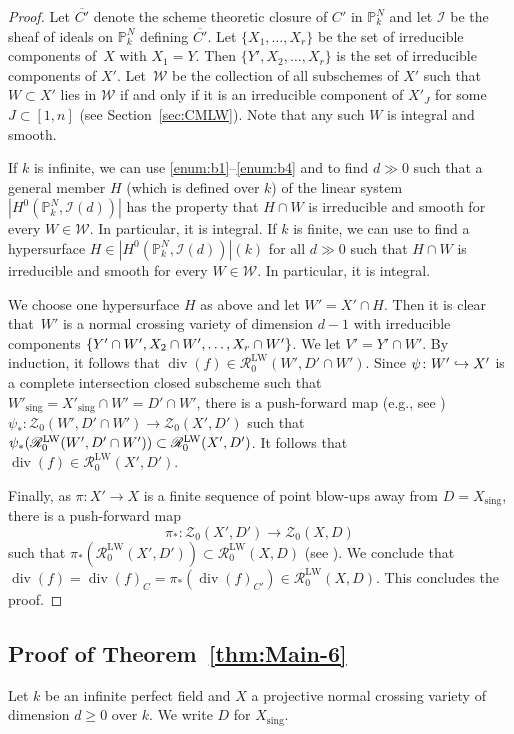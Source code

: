 \documentclass[JEP,XML,SOM,Unicode,published]{cedram}
\let\mathcal\mathscr
\def\hto{\mathrel{\lhook\joinrel\to}}
\let\inj\hto
\newcommand{\LW}{\mathrm{LW}}
\theoremstyle{definition}
\newcommand{\thmref}{Theorem~\ref}
\newcommand{\secref}{Section~\ref}
\newcommand{\sI}{{\mathcal I}}
\newcommand{\sR}{{\mathcal R}}
\newcommand{\sW}{{\mathcal W}}
\newcommand{\sZ}{{\mathcal Z}}
\renewcommand{\P}{{\mathbb P}}
\DeclareMathOperator{\divf}{div}
\newcommand{\sing}{\mathrm{sing}}
\let\ov\overline
\begin{document}
\begin{proof}
Let $\ov{C'}$ denote the scheme theoretic closure of $C'$ in $\P^N_k$ and let
$\sI$ be the sheaf of ideals on $\P^N_k$ defining $\ov{C'}$.
Let $\{X_1, \ldots , X_r\}$ be the set of irreducible components of~$X$
with $X_1 = Y$. Then $\{Y', X_2, \ldots , X_r\}$ is the set of irreducible
components of $X'$.
Let~$\sW$ be the collection of all subschemes of $X'$ such that
$W \subset X'$ lies in $\sW$ if and only if it is an irreducible component
of $X'_J$ for some $J \subset [1,n]$ (see \secref{sec:CMLW}).
Note that any such $W$ is integral and smooth.

If $k$ is infinite, we can use \eqref{enum:b1}--\eqref{enum:b4} and \cite[Th.\,3.12]{GK} to
find $d \gg 0$ such that a general member $H$ (which is defined over $k$) of
the linear system $|H^0(\P^N_k, \sI(d))|$ has the property that
$H \cap W$ is irreducible and smooth for every $W \in \sW$.
In particular, it is integral.
If $k$ is finite, we can use \cite[Prop.\,5.2, Th.\,8.4]{GK} to find a
hypersurface $H \in |H^0(\P^N_k, \sI(d))|(k)$ for all $d \gg 0$ such that
$H \cap W$ is irreducible and smooth for every $W \in \sW$.
In particular, it is integral.

We choose one hypersurface $H$ as above and let $W' = X' \cap H$. Then
it is clear that~$W'$ is a normal crossing variety of dimension $d-1$ with irreducible
components $\{Y' \cap\nobreak W', X_2 \cap W', \ldots , X_r \cap W'\}$.
We let $V' = Y' \cap W'$.
By induction, it follows that $\divf(f) \in \sR^{\LW}_0(W', D' \cap W')$.
Since $\psi \colon W' \inj X'$ is a complete intersection closed subscheme
such that $W'_{\sing} = X'_{\sing} \cap W' = D' \cap W'$, there is a
push-forward map (e.g., see \cite[Lem.\,3.10]{BK})
$\psi_* \colon \sZ_0(W', D' \cap W') \to \sZ_0(X',D')$
such that $\psi_*(\sR^{\LW}_0(W', D' \cap\nobreak W')) \subset \sR^{\LW}_0(X',D')$.
It follows that $\divf(f) \in \sR^{\LW}_0(X',D')$.

Finally, as $\pi \colon X' \to X$ is a finite sequence of point blow-ups away
from $D = X_{\sing}$,
there is a push-forward map
\[
\pi_* \colon \sZ_0(X', D') \to \sZ_0(X,D)
\]
such that $\pi_*(\sR^{\LW}_0(X', D')) \subset \sR^{\LW}_0(X,D)$
(see \cite[Lem.\,3.18]{BK}). We conclude that
$\divf(f) = \divf(f)_C = \pi_*(\divf(f)_{C'}) \in
\sR^{\LW}_0(X,D)$. This concludes the proof.
\end{proof}

\subsection{Proof of \thmref{thm:Main-6}}\label{sec:Final}
Let $k$ be an infinite perfect field
and $X$ a projective normal crossing variety of dimension $d \ge 0$ over $k$.
We write $D$ for $X_\sing$.
\end{document}
